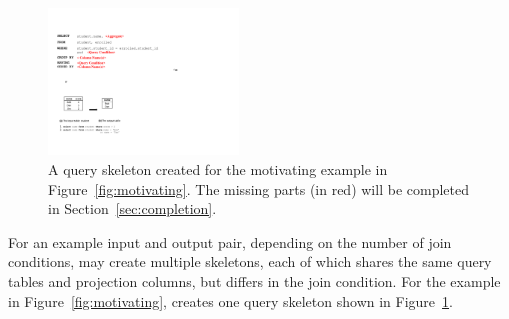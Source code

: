 
\vspace{1mm}



%

\begin{figure}[t]
	\centering
		\includegraphics[width=0.45\textwidth]{sql_skeleton.pdf}
        \vspace{-3mm}
	\caption{A query skeleton created for the motivating example
in Figure~\ref{fig:motivating}. The missing parts (in red) will
be completed in Section~\ref{sec:completion}.}
	\label{fig:skeleton}
\end{figure}


For an example input and output pair,
depending on the number of join conditions,
\ourtool may create multiple skeletons,
each of which shares the same query tables and
projection columns, but differs in the join condition.
For the example in Figure~\ref{fig:motivating},
\ourtool creates one query skeleton shown in Figure~\ref{fig:skeleton}.






